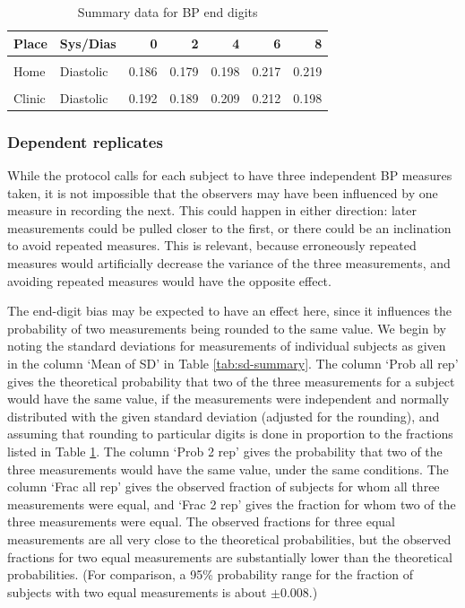 \documentclass[
]{article}
\begin{document}
\begin{table}[!h]
\centering
\caption{\label{tab:digit-summary}Summary data for BP end digits}
\centering
\begin{tabular}[t]{llrrrrr}
\toprule
Place & Sys/Dias & 0 & 2 & 4 & 6 & 8\\
\midrule
\cellcolor{gray!10}{Home} & \cellcolor{gray!10}{Systolic} & \cellcolor{gray!10}{0.240} & \cellcolor{gray!10}{0.199} & \cellcolor{gray!10}{0.159} & \cellcolor{gray!10}{0.169} & \cellcolor{gray!10}{0.233}\\
Home & Diastolic & 0.186 & 0.179 & 0.198 & 0.217 & 0.219\\
\cellcolor{gray!10}{Clinic} & \cellcolor{gray!10}{Systolic} & \cellcolor{gray!10}{0.267} & \cellcolor{gray!10}{0.188} & \cellcolor{gray!10}{0.160} & \cellcolor{gray!10}{0.159} & \cellcolor{gray!10}{0.226}\\
Clinic & Diastolic & 0.192 & 0.189 & 0.209 & 0.212 & 0.198\\
\bottomrule
\end{tabular}
\end{table}

\subsubsection{Dependent replicates}\label{sec:pseudorep}

While the protocol calls for each subject to have three independent BP measures taken, it is not impossible that the observers may have been influenced by one measure in recording the next.
This could happen in either direction: later measurements could be pulled closer to the first, or there could be an inclination to avoid repeated measures.
This is relevant, because erroneously repeated measures would artificially decrease the variance of the three measurements, and avoiding repeated measures would have the opposite effect.

The end-digit bias may be expected to have an effect here, since it influences the probability of two measurements being rounded to the same value.
We begin by noting the standard deviations for measurements of individual subjects as given in the column `Mean of SD' in Table \ref{tab:sd-summary}.
The column `Prob all rep' gives the theoretical probability that two of the three measurements for a subject would have the same value, if the measurements were independent and normally distributed with the given standard deviation (adjusted for the rounding), and assuming that rounding to particular digits is done in proportion to the fractions listed in Table \ref{tab:digit-summary}.
The column `Prob 2 rep' gives the probability that two of the three measurements would have the same value, under the same conditions.
The column `Frac all rep' gives the observed fraction of subjects for whom all three measurements were equal, and `Frac 2 rep' gives the fraction for whom two of the three measurements were equal.
The observed fractions for three equal measurements are all very close to the theoretical probabilities, but the observed fractions for two equal measurements are substantially lower than the theoretical probabilities.
(For comparison, a 95\% probability range for the fraction of subjects with two equal measurements is about \(\pm 0.008\).)
\end{document}

